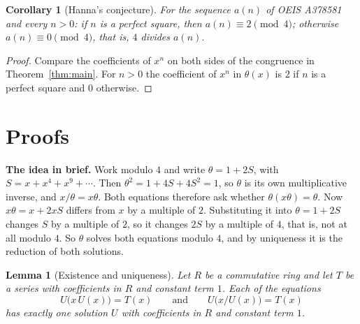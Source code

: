 \documentclass[11pt,a4paper]{article}
\newtheorem{lemma}[theorem]{Lemma}
\newtheorem{corollary}[theorem]{Corollary}
\theoremstyle{definition}
\theoremstyle{remark}
\newcommand{\para}[1]{\par\medskip\noindent\textbf{#1}\enspace}
\begin{document}
\begin{corollary}[Hanna's conjecture]\label{cor:conj}
For the sequence $a(n)$ of OEIS A378581 and every $n>0$: if $n$ is a perfect square, then $a(n)\equiv2\pmod4$;
otherwise $a(n)\equiv0\pmod4$, that is, $4$ divides $a(n)$.
\end{corollary}

\begin{proof}
Compare the coefficients of $x^n$ on both sides of the congruence in Theorem~\ref{thm:main}. For $n>0$ the coefficient
of $x^n$ in $\theta(x)$ is $2$ if $n$ is a perfect square and $0$ otherwise.
\end{proof}

\section{Proofs}\label{sec:proofs}

\para{The idea in brief.} Work modulo $4$ and write $\theta=1+2S$, with $S=x+x^4+x^9+\cdots$. Then
$\theta^2=1+4S+4S^2=1$, so $\theta$ is its own multiplicative inverse, and $x/\theta=x\theta$. Both equations therefore
ask whether $\theta(x\theta)=\theta$. Now $x\theta=x+2xS$ differs from $x$ by a multiple of $2$. Substituting it into
$\theta=1+2S$ changes $S$ by a multiple of $2$, so it changes $2S$ by a multiple of $4$, that is, not at all modulo $4$.
So $\theta$ solves both equations modulo $4$, and by uniqueness it is the reduction of both solutions.

\begin{lemma}[Existence and uniqueness]\label{lem:unique}
Let $R$ be a commutative ring and let $T$ be a series with coefficients in $R$ and constant term $1$. Each of the
equations
\[
U\bigl(x\,U(x)\bigr)=T(x)\qquad\text{and}\qquad U\bigl(x/U(x)\bigr)=T(x)
\]
has exactly one solution $U$ with coefficients in $R$ and constant term $1$.
\end{lemma}
\end{document}
